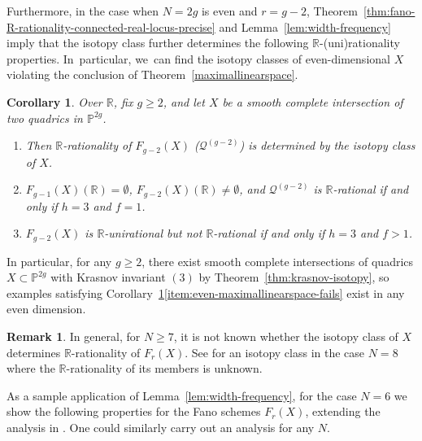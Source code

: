 \documentclass[JEP,XML,SOM,Unicode,NoEqCountersInSection,published]{cedram}
\let\cal\mathcal
\let\bb\mathbb\let\Bbb\mathbb
\theoremstyle{plain}
\newtheorem{cor}[thm]{Corollary}
\theoremstyle{definition}
\newtheorem{rem}[thm]{Remark}
\newcommand\R{\mathbb{R}}
\begin{document}
Furthermore, in the case when \(N=2g\) is even and \(r=g-2\), Theorem~\ref{thm:fano-R-rationality-connected-real-locus-precise} and Lemma~\ref{lem:width-frequency} imply that the isotopy class further determines the following \(\bb R\)\nobreakdash-(uni)rationality properties. In~particular, we~can find the isotopy classes of even-dimensional \(X\) violating the conclusion of Theorem~\ref{maximallinearspace}.
\begin{cor}\label{cor:fano-R-rationality-connected-real-locus-isotopy}
Over \(\bb R\), fix \(g \geq 2\), and let \(X\) be a smooth complete intersection of two quadrics in \(\bb P^{2g}\).
\begin{enumerate}
\item\label{item:Q-g-2-even-isotopy} Then \(\bb R\)-rationality of \(F_{g-2}(X)\) (\resp $\mathcal{Q}^{(g-2)}$) is determined by the isotopy class of \(X\).
\item\label{item:even-maximallinearspace-fails} \(F_{g-1}(X)(\bb R)=\emptyset\), \(F_{g-2}(X)(\R)\neq\emptyset\), and \(\cal Q^{(g-2)}\) is \(\bb R\)-rational if and only if \(h=3\) and \(f=1\).
\item\label{item:even-F_g-2-uni-but-irrational} \(F_{g-2}(X)\) is \(\bb R\)-unirational but not \(\bb R\)-rational if and only if \(h=3\) and \(f>1\).
\end{enumerate}
\end{cor}
In particular, for any \(g \geq 2\), there exist smooth complete intersections of quadrics \(X\subset\bb P^{2g}\) with Krasnov invariant \((3)\) by Theorem~\ref{thm:krasnov-isotopy}, so examples satisfying Corollary~\ref{cor:fano-R-rationality-connected-real-locus-isotopy}\eqref{item:even-maximallinearspace-fails} exist in any even dimension.

\begin{rem}
In general, for \(N \geq 7\), it is not known whether the isotopy class of \(X\) determines \(\bb R\)-rationality of \(F_r(X)\). See \cite[\S 6.2]{HassettKoll'arTschinkel} for an isotopy class in the case \(N=8\) where the \(\bb R\)-rationality of its members is unknown.
\end{rem}

As a sample application of Lemma~\ref{lem:width-frequency}, for the case \(N=6\) we show the following properties for the Fano schemes \(F_r(X)\), extending the analysis in \cite{HassettKoll'arTschinkel}. One could similarly carry out an analysis for any \(N\).
\end{document}
